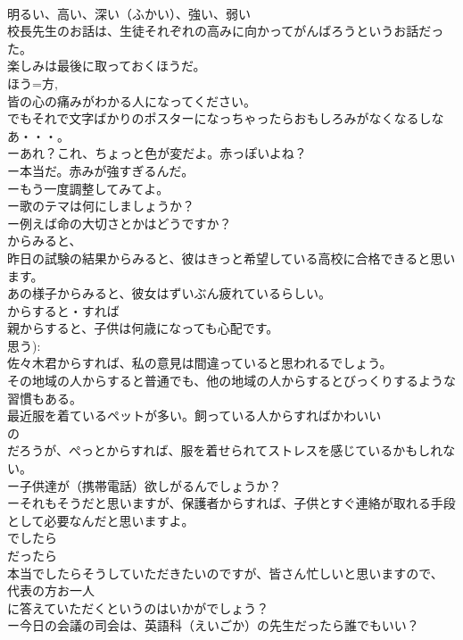 \documentclass[8pt]{extreport}
\begin{document}
\begin{CJK}{UTF8}{min}
\\	明るい、高い、深い（ふかい）、強い、弱い
\\	校長先生のお話は、生徒それぞれの高みに向かってがんばろうというお話だった。
\\	楽しみは最後に取っておくほうだ。
\\	ほう=方, 
\\	皆の心の痛みがわかる人になってください。
\\	でもそれで文字ばかりのポスターになっちゃったらおもしろみがなくなるしなあ・・・。
\\	ーあれ？これ、ちょっと色が変だよ。赤っぽいよね？
\\	ー本当だ。赤みが強すぎるんだ。
\\	ーもう一度調整してみてよ。
\\	ー歌のテマは何にしましょうか？
\\	ー例えば命の大切さとかはどうですか？	
\\	からみると、
\\	昨日の試験の結果からみると、彼はきっと希望している高校に合格できると思います。
\\	あの様子からみると、彼女はずいぶん疲れているらしい。
\\	からすると・すれば
\\	親からすると、子供は何歳になっても心配です。
\\	思う):
\\	佐々木君からすれば、私の意見は間違っていると思われるでしょう。
\\	その地域の人からすると普通でも、他の地域の人からするとびっくりするような習慣もある。
\\	最近服を着ているペットが多い。飼っている人からすればかわいい
\\	の
\\	だろうが、ぺっとからすれば、服を着せられてストレスを感じているかもしれない。
\\	ー子供達が（携帯電話）欲しがるんでしょうか？　
\\	ーそれもそうだと思いますが、保護者からすれば、子供とすぐ連絡が取れる手段として必要なんだと思いますよ。	
\\	でしたら
\\	だったら
\\	本当でしたらそうしていただきたいのですが、皆さん忙しいと思いますので、
\\	代表の方お一人
\\	に答えていただくというのはいかがでしょう？
\\	ー今日の会議の司会は、英語科（えいごか）の先生だったら誰でもいい？

\end{CJK}
\end{document}

